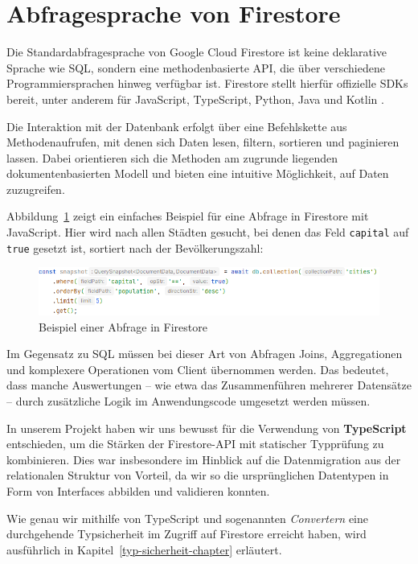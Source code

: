 \documentclass[12pt,a4paper%
              ,oneside     %
              ,titlepage
              ,DIV=13
              ,headinclude
              ,footinclude=false%
              ,cleardoublepage=empty%
              ,parskip=half,
              BCOR=0mm,
              ]{scrreprt}
\begin{document}
\section{Abfragesprache von Firestore}
\label{sprache-firestore}

Die Standardabfragesprache von Google Cloud Firestore ist keine deklarative Sprache wie SQL, sondern eine methodenbasierte API, die über verschiedene Programmiersprachen hinweg verfügbar ist. Firestore stellt hierfür offizielle SDKs bereit, unter anderem für JavaScript, TypeScript, Python, Java und Kotlin \cite{GoogleCloudQueries.2025}.

Die Interaktion mit der Datenbank erfolgt über eine Befehlskette aus Methodenaufrufen, mit denen sich Daten lesen, filtern, sortieren und paginieren lassen. Dabei orientieren sich die Methoden am zugrunde liegenden dokumentenbasierten Modell und bieten eine intuitive Möglichkeit, auf Daten zuzugreifen.

Abbildung~\ref{fig:code-example-0} zeigt ein einfaches Beispiel für eine Abfrage in Firestore mit JavaScript. Hier wird nach allen Städten gesucht, bei denen das Feld \texttt{capital} auf \texttt{true} gesetzt ist, sortiert nach der Bevölkerungszahl:

\begin{figure}[H]
	\centering
	\includegraphics[width=\linewidth]{img/code_example_0.png}
	\caption{Beispiel einer Abfrage in Firestore}
	\label{fig:code-example-0}
\end{figure}

Im Gegensatz zu SQL müssen bei dieser Art von Abfragen Joins, Aggregationen und komplexere Operationen vom Client übernommen werden. Das bedeutet, dass manche Auswertungen – wie etwa das Zusammenführen mehrerer Datensätze – durch zusätzliche Logik im Anwendungscode umgesetzt werden müssen.

In unserem Projekt haben wir uns bewusst für die Verwendung von \textbf{TypeScript} entschieden, um die Stärken der Firestore-API mit statischer Typprüfung zu kombinieren. Dies war insbesondere im Hinblick auf die Datenmigration aus der relationalen Struktur von Vorteil, da wir so die ursprünglichen Datentypen in Form von Interfaces abbilden und validieren konnten.

Wie genau wir mithilfe von TypeScript und sogenannten \textit{Convertern} eine durchgehende Typsicherheit im Zugriff auf Firestore erreicht haben, wird ausführlich in Kapitel~\ref{typ-sicherheit-chapter} erläutert.
\end{document}

